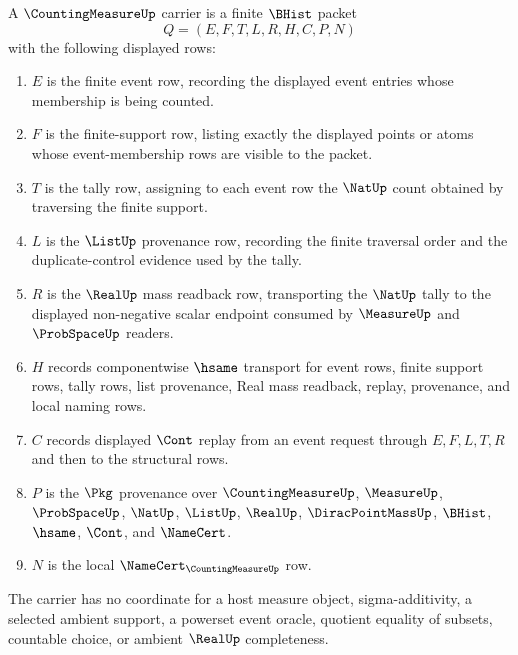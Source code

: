 \begin{definition}
\label{def:counting-measure-carrier}
A $\CountingMeasureUp$ carrier is a finite $\BHist$ packet
$$
Q=(E,F,T,L,R,H,C,P,N)
$$
with the following displayed rows:
\begin{enumerate}
\item $E$ is the finite event row, recording the displayed event entries whose membership is being counted.
\item $F$ is the finite-support row, listing exactly the displayed points or atoms whose event-membership rows are visible to the packet.
\item $T$ is the tally row, assigning to each event row the $\NatUp$ count obtained by traversing the finite support.
\item $L$ is the $\ListUp$ provenance row, recording the finite traversal order and the duplicate-control evidence used by the tally.
\item $R$ is the $\RealUp$ mass readback row, transporting the $\NatUp$ tally to the displayed non-negative scalar endpoint consumed by $\MeasureUp$ and $\ProbSpaceUp$ readers.
\item $H$ records componentwise $\hsame$ transport for event rows, finite support rows, tally rows, list provenance, Real mass readback, replay, provenance, and local naming rows.
\item $C$ records displayed $\Cont$ replay from an event request through $E,F,L,T,R$ and then to the structural rows.
\item $P$ is the $\Pkg$ provenance over $\CountingMeasureUp$, $\MeasureUp$, $\ProbSpaceUp$, $\NatUp$, $\ListUp$, $\RealUp$, $\DiracPointMassUp$, $\BHist$, $\hsame$, $\Cont$, and $\NameCert$.
\item $N$ is the local $\NameCert_{\CountingMeasureUp}$ row.
\end{enumerate}
The carrier has no coordinate for a host measure object, sigma-additivity, a selected ambient support, a powerset event oracle, quotient equality of subsets, countable choice, or ambient $\RealUp$ completeness.
\end{definition}

